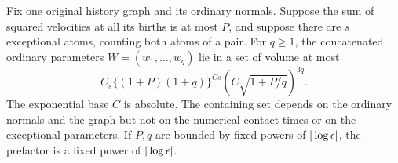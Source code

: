 \begin{lemma}\label{lem:cutoff-ellipsoid}
Fix one original history graph and its ordinary normals.
Suppose the sum of squared velocities at all its births is at
most \(P\), and suppose there are \(s\) exceptional atoms,
counting both atoms of a pair.  For \(q\geq1\), the concatenated
ordinary parameters \(W=(w_1,\ldots,w_q)\) lie in a set of
volume at most
\begin{equation}\label{eq:cutoff-ellipsoid}
 C_s\{(1+P)(1+q)\}^{C s}
 \left(C\sqrt{1+P/q}\right)^{3q}.
\end{equation}
The exponential base \(C\) is absolute.  The containing set
depends on the ordinary normals and the graph but not on the
numerical contact times or on the exceptional parameters.
If \(P,q\) are bounded by fixed powers of \(|\log\epsilon|\),
the prefactor is a fixed power of \(|\log\epsilon|\).
\end{lemma}

